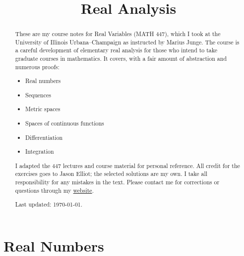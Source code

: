 \documentclass[11pt,twoside,notitlepage]{report}
\title{Real Analysis}
\date{}
\begin{document}
    \maketitle
    \thispagestyle{empty}

    \begin{abstract}
        These are my course notes for Real Variables (MATH 447), which I took at the University of Illinois Urbana--Champaign as instructed by Marius Junge.
        The course is a careful development of elementary real analysis for those who intend to take graduate courses in mathematics.
        It covers, with a fair amount of abstraction and numerous proofs:
        \begin{itemize}[noitemsep]
            \item Real numbers
            \item Sequences
            \item Metric spaces
            \item Spaces of continuous functions
            \item Differentiation
            \item Integration
        \end{itemize}

        I adapted the 447 lectures and course material for personal reference.
        All credit for the exercises goes to Jason Elliot; the selected solutions are my own.
        I take all responsibility for any mistakes in the text.
        Please contact me for corrections or questions through my \href{https://ericmordonez.com}{website}.

        Last updated: \today.
    \end{abstract}

    {\sffamily\tableofcontents}
    \thispagestyle{empty}

    \pagestyle{main}

    \part{Real Numbers}
\end{document}
